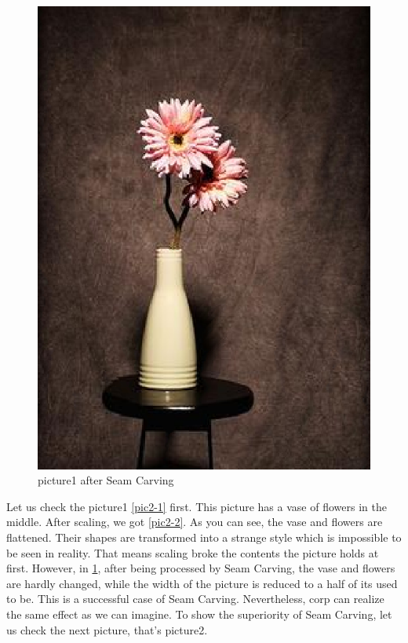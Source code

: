 \documentclass[final]{cvpr}
\begin{document}
\begin{figure}
\begin{center}
    \includegraphics[scale=0.15]{pics/2-3.png}
    \caption{picture1 after Seam Carving}
    \label{pic2-3} 
\end{center}
\end{figure}

Let us check the picture1 \ref{pic2-1} first. This picture has a vase of flowers in the middle. After scaling, we got \ref{pic2-2}. As you can see, the vase and flowers are flattened. Their shapes are transformed into a strange style which is impossible to be seen in reality. That means scaling broke the contents the picture holds at first. However, in \ref{pic2-3}, after being processed by Seam Carving, the vase and flowers are hardly changed, while the width of the picture is reduced to a half of its used to be. This is a successful case of Seam Carving. Nevertheless, corp can realize the same effect as we can imagine. To show the superiority of Seam Carving, let us check the next picture, that's picture2.
\end{document}
